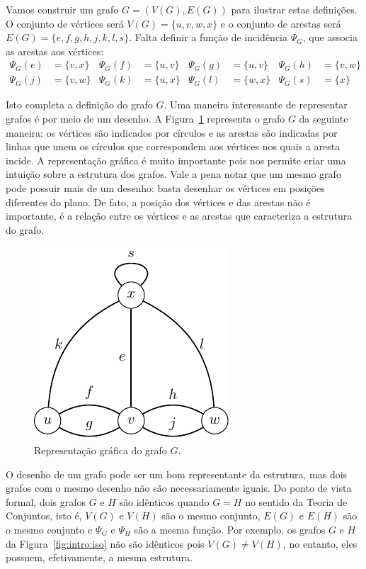 Vamos construir um grafo $G = (V(G), E(G))$ para ilustrar estas definições. O conjunto de vértices será $V(G) = \{u,v,w,x\}$ e o conjunto de arestas será $E(G) = \{e, f, g, h, j, k, l, s\}$. Falta definir a função de incidência $\Psi_G$, que associa as arestas aos vértices:
\begin{align*}
\Psi_G(e) &= \{v,x\} &
\Psi_G(f) &= \{u,v\} &
\Psi_G(g) &= \{u,v\} &
\Psi_G(h) &= \{v,w\} \\
\Psi_G(j) &= \{v,w\} &
\Psi_G(k) &= \{u,x\} &
\Psi_G(l) &= \{w,x\} &
\Psi_G(s) &= \{x\}
\end{align*}

Isto completa a definição do grafo $G$. Uma maneira interessante de representar grafos é por meio de um desenho. A Figura~\ref{fig:intro:grafo} representa o grafo $G$ da seguinte maneira: os vértices são indicados por círculos e as arestas são indicadas por linhas que unem os círculos que correspondem aos vértices nos quais a aresta incide. A representação gráfica é muito importante pois nos permite criar uma intuição sobre a estrutura dos grafos. Vale a pena notar que um mesmo grafo pode possuir mais de um desenho: basta desenhar os vértices em posições diferentes do plano. De fato, a posição dos vértices e das arestas não é importante, é a relação entre os vértices e as arestas que caracteriza a estrutura do grafo.

\begin{figure}[ht!]
\centering
\includegraphics{figures/1_intro_1_grafo}
\caption{Representação gráfica do grafo $G$.}
\label{fig:intro:grafo}
\end{figure}

O desenho de um grafo pode ser um bom representante da estrutura, mas dois grafos com o mesmo desenho não são necessariamente iguais. Do ponto de vista formal, dois grafos $G$ e $H$ são idênticos quando $G = H$ no sentido da Teoria de Conjuntos, isto é, $V(G)$ e $V(H)$ são o mesmo conjunto, $E(G)$ e $E(H)$ são o mesmo conjunto e $\Psi_G$ e $\Psi_H$ são a mesma função. Por exemplo, os grafos $G$ e $H$ da Figura~\ref{fig:intro:iso} não são idênticos pois $V(G) \neq V(H)$, no entanto, eles possuem, efetivamente, a mesma estrutura.

